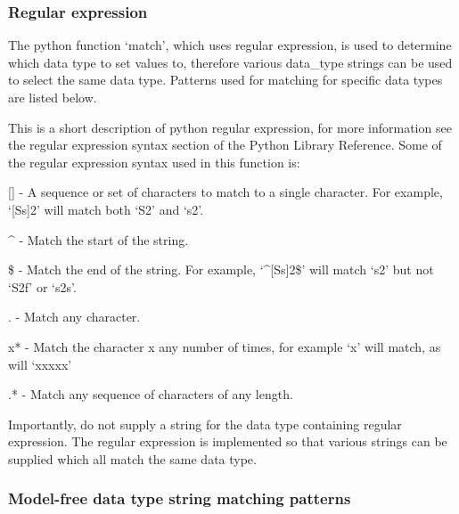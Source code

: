 \subsubsection{Regular expression}

The python function `match', which uses regular expression, is used to determine which data
type to set values to, therefore various data\_type strings can be used to select the same
data type.  Patterns used for matching for specific data types are listed below.

This is a short description of python regular expression, for more information see the
regular expression syntax section of the Python Library Reference.  Some of the regular
expression syntax used in this function is:

    [] - A sequence or set of characters to match to a single character.  For example,
    `[Ss]2' will match both `S2' and `s2'.

    \^{} - Match the start of the string.

    \$ - Match the end of the string.  For example, `\^{}[Ss]2\$' will match `s2' but not `S2f'
    or `s2s'.

    . - Match any character.

    x* - Match the character x any number of times, for example `x' will match, as will
    `xxxxx'

    .* - Match any sequence of characters of any length.

Importantly, do not supply a string for the data type containing regular expression.  The
regular expression is implemented so that various strings can be supplied which all match
the same data type.


\subsubsection{Model-free data type string matching patterns}



